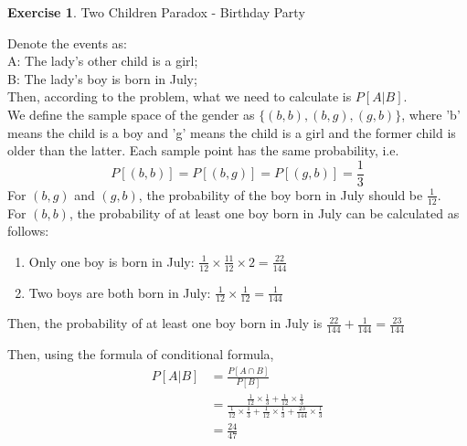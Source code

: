 \documentclass[12pt,a4paper]{article}
\makeatletter
\theoremstyle{definition}
\newtheorem{exercise}{Exercise}
\newtheorem*{solution}{Solution}
\renewenvironment{solution}[1][Solution] {\par\pushQED{\qed}\normalfont\topsep6\p@\@plus6\p@\relax\trivlist\item[\hskip\labelsep\bfseries#1\@addpunct{.}]\ignorespaces}{\popQED\endtrivlist\@endpefalse} \makeatother
\makeatother
\begin{document}
\begin{exercise}
   Two Children Paradox - Birthday Party\\
   \begin{solution}
Denote the events as:\\
A: The lady's other child is a girl;\\
B: The lady's boy is born in July;\\
Then, according to the problem, what we need to calculate is $P[A|B]$.\\
We define the sample space of the gender as $\{(b,b),(b,g),(g,b)\}$, where 'b' means the child is a boy and 'g' means the child is a girl and the former child is older than the latter. Each sample point has the same probability, i.e. $$P[(b,b)]=P[(b,g)]=P[(g,b)]=\frac{1}{3}$$
For $(b,g)$ and $(g,b)$, the probability of the boy born in July should be $\frac{1}{12}$.\\
For $(b,b)$, the probability of at least one boy born in July can be calculated as follows:
\begin{enumerate}[label=\roman*)]
    \item Only one boy is born in July: $\frac{1}{12}\times\frac{11}{12}\times 2=\frac{22}{144}$
    \item Two boys are both born in July: $\frac{1}{12}\times\frac{1}{12}=\frac{1}{144}$
\end{enumerate}
Then, the probability of at least one boy born in July is $\frac{22}{144}+\frac{1}{144}=\frac{23}{144}$
   \end{solution}

Then, using the formula of conditional formula,
\begin{align*}
    P[A|B]&=\frac{P[A\cap B]}{P[B]}\\
    &=\frac{\frac{1}{12}\times \frac{1}{3}+\frac{1}{12}\times\frac{1}{3}}{\frac{1}{12}\times\frac{1}{3}+\frac{1}{12}\times\frac{1}{3}+\frac{23}{144}\times \frac{1}{3}}\\
    &=\frac{24}{47}
\end{align*}
    \end{exercise}
\end{document}
